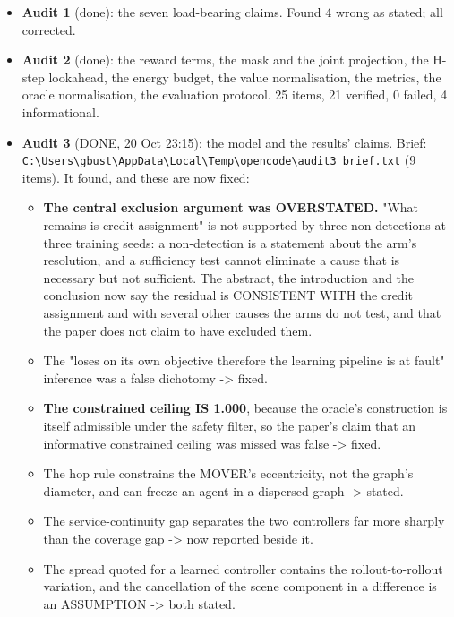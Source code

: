 \documentclass[11pt,a4paper]{article}
\begin{document}
\begin{itemize}[leftmargin=1.15em,itemsep=4pt,topsep=2pt,label={\color{uavblue}\scriptsize\textbullet}]
\item \textbf{Audit 1} (done): the seven load-bearing claims. Found 4 wrong as stated; all corrected.
\item \textbf{Audit 2} (done): the reward terms, the mask and the joint projection, the H-step lookahead, the energy budget, the value normalisation, the metrics, the oracle normalisation, the evaluation protocol. 25 items, 21 verified, 0 failed, 4 informational.
\item \textbf{Audit 3} (DONE, 20 Oct 23:15): the model and the results' claims. Brief: \texttt{C:\textbackslash{}\allowbreak{}Users\textbackslash{}\allowbreak{}gbust\textbackslash{}\allowbreak{}AppData\textbackslash{}\allowbreak{}Local\textbackslash{}\allowbreak{}Temp\textbackslash{}\allowbreak{}opencode\textbackslash{}\allowbreak{}audit3\_brief.txt} (9 items). It found, and these are now fixed:
\begin{itemize}[leftmargin=1.25em,itemsep=1.5pt,topsep=2pt,label={\color{uavmuted}\scriptsize\textendash}]
\item \textbf{The central exclusion argument was OVERSTATED.} "What remains is credit assignment" is not supported by three non-detections at three training seeds: a non-detection is a statement about the arm's resolution, and a sufficiency test cannot eliminate a cause that is necessary but not sufficient. The abstract, the introduction and the conclusion now say the residual is CONSISTENT WITH the credit assignment and with several other causes the arms do not test, and that the paper does not claim to have excluded them.
\item The "loses on its own objective therefore the learning pipeline is at fault" inference was a false dichotomy -> fixed.
\item \textbf{The constrained ceiling IS 1.000}, because the oracle's construction is itself admissible under the safety filter, so the paper's claim that an informative constrained ceiling was missed was false -> fixed.
\item The hop rule constrains the MOVER's eccentricity, not the graph's diameter, and can freeze an agent in a dispersed graph -> stated.
\item The service-continuity gap separates the two controllers far more sharply than the coverage gap -> now reported beside it.
\item The spread quoted for a learned controller contains the rollout-to-rollout variation, and the cancellation of the scene component in a difference is an ASSUMPTION -> both stated.

\end{itemize}
\end{itemize}
\end{document}
